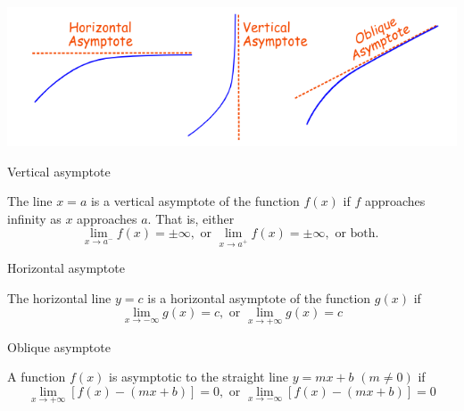 \documentclass[12pt]{article}
\begin{document}
\begin{center}
    \includegraphics[scale=0.4]{Types of asymptotes.png}
\end{center}

\begin{definition}{Vertical asymptote}
    
    The line $x=a$ is a vertical asymptote of the function $f(x)$ if $f$ approaches infinity as $x$ approaches $a$. That is, either \[
        \lim_{x \to a^-} f(x) = \pm \infty, \text{ or } \lim_{x \to a^+} f(x) = \pm \infty, \text{ or both. }
    \]
\end{definition}
\begin{definition}{Horizontal asymptote}

    The horizontal line $y=c$ is a horizontal asymptote of the function $g(x)$ if \[
        \lim_{x \to -\infty} g(x) = c, \text{ or } \lim_{x \to +\infty} g(x) = c
    \]
\end{definition}
\begin{definition}{Oblique asymptote}

    A function $f(x)$ is asymptotic to the straight line $y=mx+b$ $(m \neq 0)$ if \[
        \lim_{x \to +\infty} \left[ f(x) - (mx+b) \right] = 0, \text{ or } \lim_{x \to -\infty} \left[ f(x) - (mx+b) \right] = 0
    \]
\end{definition}
\end{document}
